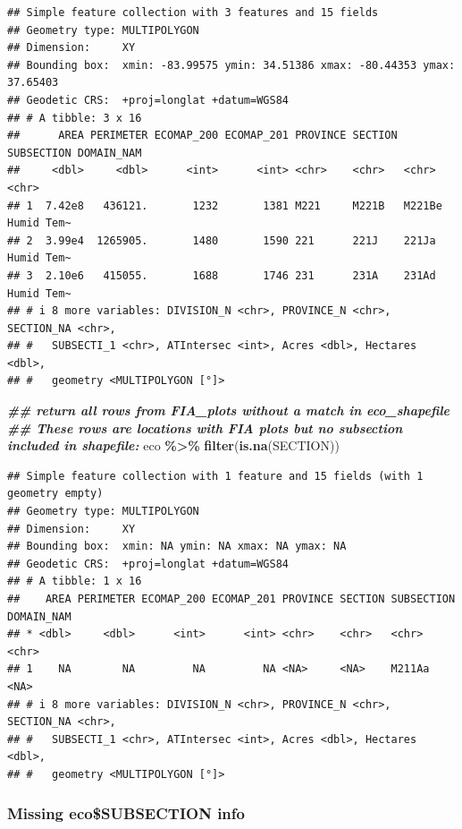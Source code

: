 \documentclass[
]{book}
\newenvironment{Shaded}{\begin{snugshade}}{\end{snugshade}}
\newcommand{\DocumentationTok}[1]{\textcolor[rgb]{0.56,0.35,0.01}{\textbf{\textit{#1}}}}
\newcommand{\FunctionTok}[1]{\textcolor[rgb]{0.13,0.29,0.53}{\textbf{#1}}}
\newcommand{\NormalTok}[1]{#1}
\newcommand{\SpecialCharTok}[1]{\textcolor[rgb]{0.81,0.36,0.00}{\textbf{#1}}}
\begin{document}
\begin{verbatim}
## Simple feature collection with 3 features and 15 fields
## Geometry type: MULTIPOLYGON
## Dimension:     XY
## Bounding box:  xmin: -83.99575 ymin: 34.51386 xmax: -80.44353 ymax: 37.65403
## Geodetic CRS:  +proj=longlat +datum=WGS84
## # A tibble: 3 x 16
##      AREA PERIMETER ECOMAP_200 ECOMAP_201 PROVINCE SECTION SUBSECTION DOMAIN_NAM
##     <dbl>     <dbl>      <int>      <int> <chr>    <chr>   <chr>      <chr>     
## 1  7.42e8   436121.       1232       1381 M221     M221B   M221Be     Humid Tem~
## 2  3.99e4  1265905.       1480       1590 221      221J    221Ja      Humid Tem~
## 3  2.10e6   415055.       1688       1746 231      231A    231Ad      Humid Tem~
## # i 8 more variables: DIVISION_N <chr>, PROVINCE_N <chr>, SECTION_NA <chr>,
## #   SUBSECTI_1 <chr>, ATIntersec <int>, Acres <dbl>, Hectares <dbl>,
## #   geometry <MULTIPOLYGON [°]>
\end{verbatim}

\begin{Shaded}
\begin{Highlighting}[]
\DocumentationTok{\#\# return all rows from FIA\_plots without a match in eco\_shapefile}
\DocumentationTok{\#\# These rows are locations with FIA plots but no subsection included in shapefile:}
\NormalTok{eco }\SpecialCharTok{\%\textgreater{}\%} \FunctionTok{filter}\NormalTok{(}\FunctionTok{is.na}\NormalTok{(SECTION)) }
\end{Highlighting}
\end{Shaded}

\begin{verbatim}
## Simple feature collection with 1 feature and 15 fields (with 1 geometry empty)
## Geometry type: MULTIPOLYGON
## Dimension:     XY
## Bounding box:  xmin: NA ymin: NA xmax: NA ymax: NA
## Geodetic CRS:  +proj=longlat +datum=WGS84
## # A tibble: 1 x 16
##    AREA PERIMETER ECOMAP_200 ECOMAP_201 PROVINCE SECTION SUBSECTION DOMAIN_NAM
## * <dbl>     <dbl>      <int>      <int> <chr>    <chr>   <chr>      <chr>     
## 1    NA        NA         NA         NA <NA>     <NA>    M211Aa     <NA>      
## # i 8 more variables: DIVISION_N <chr>, PROVINCE_N <chr>, SECTION_NA <chr>,
## #   SUBSECTI_1 <chr>, ATIntersec <int>, Acres <dbl>, Hectares <dbl>,
## #   geometry <MULTIPOLYGON [°]>
\end{verbatim}

\hypertarget{missing-ecosubsection-info}{%
\subsubsection{Missing eco\$SUBSECTION info}\label{missing-ecosubsection-info}}
\end{document}

